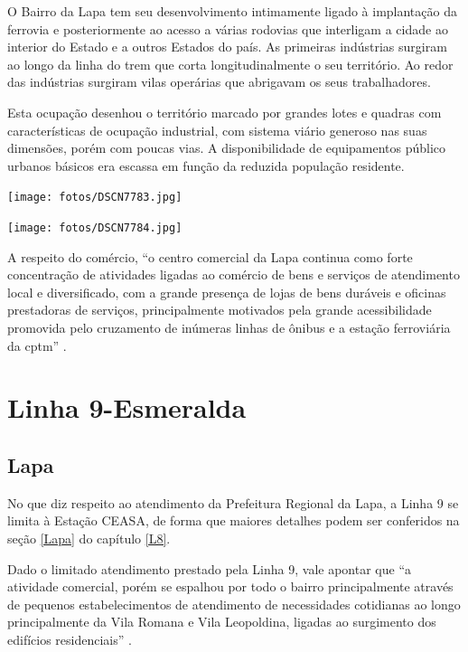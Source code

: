 	\begin{citacao}
		O Bairro da Lapa tem seu desenvolvimento intimamente ligado à implantação da ferrovia e posteriormente ao acesso a várias rodovias que interligam a cidade ao interior do Estado e a outros Estados do país. As primeiras indústrias surgiram ao longo da linha do trem que corta longitudinalmente o seu território. Ao redor das indústrias surgiram vilas operárias que abrigavam os seus trabalhadores.
		
		Esta ocupação desenhou o território marcado por grandes lotes e quadras com características de ocupação industrial, com sistema viário generoso nas suas dimensões, porém com poucas vias. A disponibilidade de equipamentos público urbanos básicos era escassa em função da reduzida população residente.
	\end{citacao}
	
	\noindent
	\begin{minipage}[b]{.4\textwidth}
		\texttt{[image: fotos/DSCN7783.jpg]}
	\end{minipage}%
	\hfill
	\begin{minipage}[b]{.4\linewidth}
		\texttt{[image: fotos/DSCN7784.jpg]}
	\end{minipage}
	
	A respeito do comércio, ``o centro comercial da Lapa continua como forte concentração de atividades ligadas ao comércio de bens e serviços de atendimento local e diversificado, com a grande presença de lojas de bens duráveis e oficinas prestadoras de serviços, principalmente motivados pela grande acessibilidade promovida pelo cruzamento de inúmeras linhas de ônibus e a estação ferroviária da \gls{cptm}'' \cite[pág. 103]{planocentro}.


	\section{Linha 9-Esmeralda} \label{L9}
	
	\subsection{Lapa}
	
	No que diz respeito ao atendimento da Prefeitura Regional da Lapa, a Linha 9 se limita à Estação CEASA, de forma que maiores detalhes podem ser conferidos na seção \ref{Lapa} do capítulo \ref{L8}.
	
	Dado o limitado atendimento prestado pela Linha 9, vale apontar que ``a atividade comercial, porém se espalhou por todo o bairro principalmente através de pequenos estabelecimentos de atendimento de necessidades cotidianas ao longo principalmente da Vila Romana e Vila Leopoldina, ligadas ao surgimento dos edifícios residenciais'' \cite[pág. 103]{planocentro}.
	
